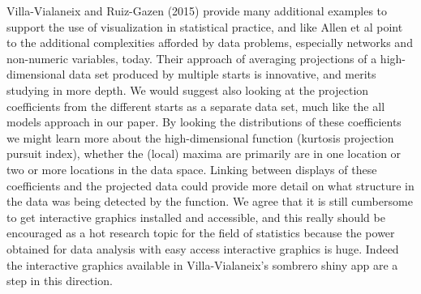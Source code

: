 \documentclass[preprint]{imsart}
\begin{document}
Villa-Vialaneix and Ruiz-Gazen (2015) provide many additional examples to support the use of visualization in statistical practice, and like Allen et al point to the additional complexities afforded by data problems, especially networks and non-numeric variables, today. Their approach of averaging projections of a high-dimensional data set produced by multiple starts is innovative, and merits studying in more depth. We would suggest also looking at the projection coefficients from the different starts as a separate data set, much like the all models approach in our paper. By looking the distributions of these coefficients we might learn more about the high-dimensional function (kurtosis projection pursuit index), whether the (local) maxima are primarily are in one location or two or more locations in the data space. Linking between displays of these coefficients and the projected data could provide more detail on what structure in the data was being detected by the function. We agree that it is still cumbersome to get interactive graphics installed and accessible, and this really should be encouraged as a hot research topic for the field of statistics because the power obtained  for data analysis with easy access interactive graphics is huge. Indeed the interactive graphics available in Villa-Vialaneix's sombrero shiny app are a step in this direction.



\end{document}
